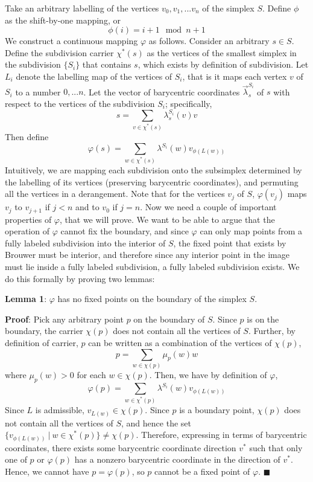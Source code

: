 \documentclass[10pt,letter]{article}
\begin{document}
Take an arbitrary labelling of the vertices $v_0, v_1, ... v_n$ of the simplex $S$. Define $\phi$ as the shift-by-one mapping, or \[ \phi(i) = i + 1 \mod {n+1} \]
We construct a continuous mapping $\varphi$ as follows. Consider an arbitrary $s \in S$. Define the subdivision carrier $\chi^*(s)$ as the vertices of the smallest simplex in the subdivision $\{ S_i \}$ that contains $s$, which exists by definition of subdivision. Let $L_i$ denote the labelling map of the vertices of $S_i$, that is it maps each vertex $v$ of $S_i$ to a number $0, ... n$. Let the vector of barycentric coordinates $\vec{\lambda}^{S_i}_s$ of $s$ with respect to the vertices of the subdivision $S_i$; specifically,
\[ s = \sum_{v \in \chi^*(s) } \lambda^{S_i}_s(v) v  \]
Then define
\[ \varphi(s) = \sum_{w \in \chi^*(s) } \lambda^{S_i}(w) v_{\phi(L(w))} \]
Intuitively, we are mapping each subdivision onto the subsimplex determined by the labelling of its vertices (preserving barycentric coordinates), and permuting all the vertices in a derangement. Note that for the vertices $v_j$ of $S$, $\varphi(v_j)$ maps $v_j$ to $v_{j+1}$ if $j < n$ and to $v_0$ if $j=n$. Now we need a couple of important properties of $\varphi$, that we will prove. We want to be able to argue that the operation of $\varphi$ cannot fix the boundary, and since $\varphi$ can only map points from a fully labeled subdivision into the interior of $S$, the fixed point that exists by Brouwer must be interior, and therefore since any interior point in the image must lie inside a fully labeled subdivision, a fully labeled subdivision exists. We do this formally by proving two lemmas:

\textbf{Lemma 1}: $\varphi$ has no fixed points on the boundary of the simplex $S$.

\textbf{Proof}:  Pick any arbitrary point $p$ on the boundary of $S$. Since $p$ is on the boundary, the carrier $\chi(p)$ does not contain all the vertices of $S$. Further, by definition of carrier, $p$ can be written as a combination of the vertices of $\chi(p)$,
\[ p = \sum_{w \in \chi(p)} \mu_p(w)w  \]
where $\mu_p(w) > 0$ for each $w \in \chi(p)$. Then, we have by definition of $\varphi$,
\[ \varphi(p) = \sum_{w \in \chi^*(p) } \lambda^{S_i}(w) v_{\phi(L(w))} \]
Since $L$ is admissible, $v_{L(w)} \in \chi(p)$. Since $p$ is a boundary point, $\chi(p)$ does not contain all the vertices of $S$, and hence the set $\{ v_{\phi(L(w))} \ | \ w \in \chi^*(p)\} \neq \chi(p) $. Therefore, expressing in terms of barycentric coordinates, there exists some barycentric coordinate direction $v^*$ such that only one of $p$ or $\varphi(p)$ has a nonzero barycentric coordinate in the direction of $v^*$. Hence, we cannot have $p = \varphi(p)$, so $p$ cannot be a fixed point of $\varphi$. $\blacksquare$ \\
\end{document}
